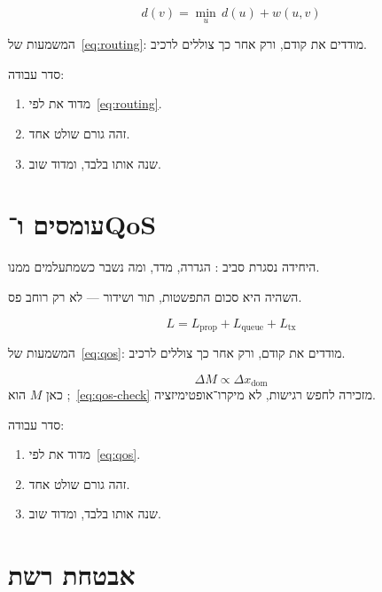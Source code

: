 \begin{equation}
\label{eq:routing}
d(v)=\min_u\, d(u)+w(u,v)
\end{equation}

המשמעות של~\eqref{eq:routing}: מודדים את  קודם, ורק אחר כך צוללים לרכיב.

סדר עבודה:
\begin{enumerate}
\item[(\textbf{א})] מדוד את  לפי~\eqref{eq:routing}.
\item[(\textbf{ב})] זהה גורם שולט אחד.
\item[(\textbf{ג})] שנה אותו בלבד, ומדוד שוב.
\end{enumerate}

\chapter{עומסים ו־QoS}
\label{ch:qos}

היחידה נסגרת סביב : הגדרה, מדד, ומה נשבר כשמתעלמים ממנו.

\begin{keybox}[frametitle={רעיון מפתח — עומסים ו־QoS}]
השהיה היא סכום התפשטות, תור ושידור — לא רק רוחב פס.
\end{keybox}

\begin{equation}
\label{eq:qos}
L = L_{\mathrm{prop}}+L_{\mathrm{queue}}+L_{\mathrm{tx}}
\end{equation}

המשמעות של~\eqref{eq:qos}: מודדים את  קודם, ורק אחר כך צוללים לרכיב.

\begin{equation}
\label{eq:qos-check}
\Delta M \propto \Delta x_{\mathrm{dom}}
\end{equation}
כאן $M$ הוא ;~\eqref{eq:qos-check} מזכירה לחפש רגישות, לא מיקרו־אופטימיזציה.

סדר עבודה:
\begin{enumerate}
\item[(\textbf{א})] מדוד את  לפי~\eqref{eq:qos}.
\item[(\textbf{ב})] זהה גורם שולט אחד.
\item[(\textbf{ג})] שנה אותו בלבד, ומדוד שוב.
\end{enumerate}

\chapter{אבטחת רשת}
\label{ch:netsec}

